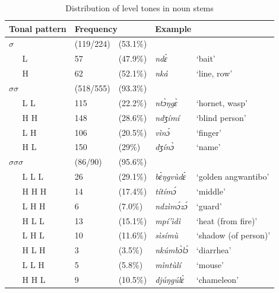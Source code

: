 \begin{table} 
\centering
\begin{tabular}{ll|ll|ll}
 \multicolumn{2}{l|}{Tonal pattern} & \multicolumn{2}{l|}{Frequency} & \multicolumn{2}{l}{Example} \\  \midrule
 \multicolumn{2}{l|}{$\sigma$} &  (119/224) &   (53.1\%) & & \\ 

& L & 	57 &  	(47.9\%) & {\itshape ndɛ̀} & `bait' \\
 & H &  	62 &  	(52.1\%) & {\itshape nká} & `line, row'  \\
 \midrule
 \multicolumn{2}{l|}{$\sigma$$\sigma$} & (518/555) & (93.3\%) & & \\
 & L L 	& 115 &  		(22.2\%) & {\itshape ntɔ̀ŋgɛ̀} & `hornet, wasp' \\
 & H H & 	148 & 		(28.6\%) & {\itshape ndʒímí} & `blind person' \\
 & L H  & 	106	& 	(20.5\%) & {\itshape vìnɔ́}  & `finger'  \\
 & H L & 	150 & 		(29\%) & {\itshape dʒínɔ̀} & `name' \\
 \midrule
 \multicolumn{2}{l|}{$\sigma$$\sigma$$\sigma$} & (86/90) & (95.6\%) \\

 & L L L 	& 26 & (29.1\%) & {\itshape bɛ̀ŋgvùdɛ̀} & `golden angwantibo'   \\
 & H H H 	& 14 & (17.4\%) & {\itshape títímɔ́} & `middle' \\
 & L H H 	& 6 &  (7.0\%) & {\itshape ndzìmɔ́zɔ́} & `guard'  \\
 & H L L &  13 & (15.1\%) & {\itshape mpí'ìdì} & `heat (from fire)' \\ 
 & L H L 	& 10 & (11.6\%) & {\itshape sìsímù} & `shadow (of person)' \\
 & H L H 	& 3  & (3.5\%) & {\itshape nkúmbɔ̀lɔ́} & `diarrhea' \\
 & L L H 	& 5 & (5.8\%) & {\itshape mìntùlí} & `mouse' \\
 & H H L  & 9 & (10.5\%) & {\itshape djúŋgúlɛ̀} & `chameleon' \\   \midrule
\end{tabular}
\caption{Distribution of level tones in noun stems}
\label{Tab:ToneN}
\end{table} 


